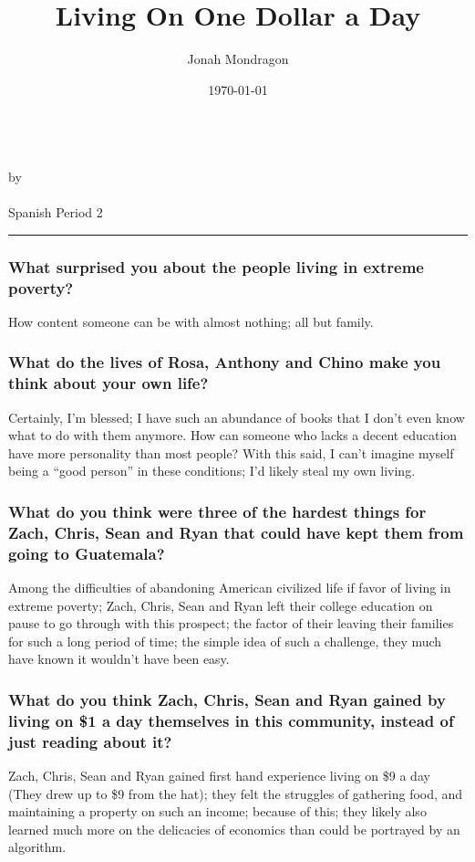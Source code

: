 \documentclass{article}
\title{Living On One Dollar a Day}
\author{Jonah Mondragon}
\date{\today}
\renewcommand{\maketitle}
{
    \begin{center}
        {\huge\bfseries\thetitle}\\
        \vspace{1pt}
        by \theauthor\\
        \thedate\\
        Spanish Period 2
    \end{center}
    \hrule
    \vspace{3pt}
}
\begin{document}
\pagestyle{empty}
\maketitle

\subsubsection*{What surprised you about the people living in extreme poverty?}
    \begin{adjustwidth}{24pt}{0in}
        How content someone can be with almost nothing; all but family.
    \end{adjustwidth}
\subsubsection*{What do the lives of Rosa, Anthony and Chino make you think about your own life?}
    \begin{adjustwidth}{24pt}{0in}
        Certainly, I'm blessed; I have such an abundance of books that I don't even know what to do with them anymore.
        How can someone who lacks a decent education have more personality than most people?
        With this said, I can't imagine myself being a ``good person'' in these conditions; I'd likely steal my own living.
    \end{adjustwidth}
\subsubsection*{What do you think were three of the hardest things for Zach, Chris, Sean and Ryan that could have kept them from going to Guatemala?}
    \begin{adjustwidth}{24pt}{0in}
        Among the difficulties of abandoning American civilized life if favor of living in extreme poverty;
        Zach, Chris, Sean and Ryan left their college education on pause to go through with this prospect;
        the factor of their leaving their families for such a long period of time;
        the simple idea of such a challenge, they much have known it wouldn't have been easy.    
    \end{adjustwidth}
\subsubsection*{What do you think Zach, Chris, Sean and Ryan gained by living on \$1 a day themselves in this community, instead of just reading about it?}
    \begin{adjustwidth}{24pt}{0in}
        Zach, Chris, Sean and Ryan gained first hand experience living on \$9 a day (They drew up to \$9 from the hat);
        they felt the struggles of gathering food, and maintaining a property on such an income;
        because of this; they likely also learned much more on the delicacies of economics than could be portrayed by an algorithm.
    \end{adjustwidth}
\end{document}
